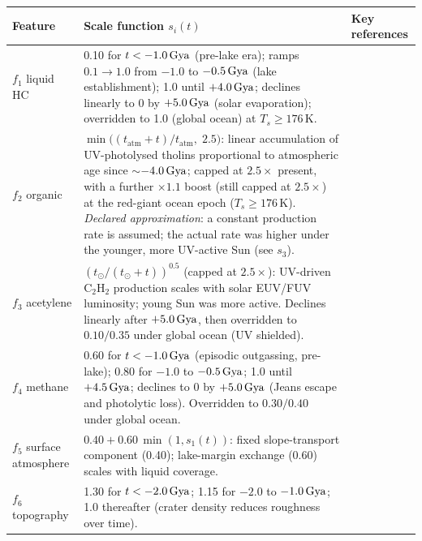 \begin{table}[H]
\centering
\small
\begin{tabular}{p{3.2cm}p{7.0cm}p{3.6cm}}
\toprule
\textbf{Feature} & \textbf{Scale function $s_i(t)$} & \textbf{Key references} \\
\midrule
$f_1$ liquid HC &
  0.10 for $t < -1.0\,\text{Gya}$ (pre-lake era); ramps $0.1\to1.0$ from $-1.0$ to
  $-0.5\,\text{Gya}$ (lake establishment); 1.0 until $+4.0\,\text{Gya}$; declines linearly
  to 0 by $+5.0\,\text{Gya}$ (solar evaporation);
  overridden to 1.0 (global ocean) at $T_s \geq 176\,\mathrm{K}$. &
  \citet{Tobie2006,MitchellLora2016,Lorenz1997,Hayes2016} \\[4pt]

$f_2$ organic &
  $\min\!\bigl((t_\text{atm}\!+\!t)/t_\text{atm},\;2.5\bigr)$: linear accumulation of
  UV-photolysed tholins proportional to atmospheric age since $\sim$$-4.0\,\text{Gya}$;
  capped at $2.5\times$ present, with a further $\times1.1$ boost (still capped at
  $2.5\times$) at the red-giant ocean epoch ($T_s \geq 176\,\mathrm{K}$).  \emph{Declared approximation}: a constant
  production rate is assumed; the actual rate was higher under the younger,
  more UV-active Sun (see $s_3$). &
  \citet{Lavvas2011,Cable2012,Vuitton2007,Niemann2005} \\[4pt]

$f_3$ acetylene &
  $(t_\odot/(t_\odot\!+\!t))^{0.5}$ (capped at $2.5\times$): UV-driven C$_2$H$_2$ production scales with
  solar EUV/FUV luminosity; young Sun was more active.  Declines linearly after
  $+5.0\,\text{Gya}$, then overridden to $0.10/0.35$ under global ocean (UV shielded). &
  \citet{Strobel2010,Lavvas2011,Bahcall2001,Loison2015} \\[4pt]

$f_4$ methane &
  0.60 for $t < -1.0\,\text{Gya}$ (episodic outgassing, pre-lake); 0.80 for
  $-1.0$ to $-0.5\,\text{Gya}$; 1.0 until $+4.5\,\text{Gya}$; declines to 0 by $+5.0\,\text{Gya}$
  (Jeans escape and photolytic loss).  Overridden to $0.30/0.40$ under
  global ocean. &
  \citet{Tobie2006,Niemann2005,Flasar2005,MitchellLora2016,Strobel2010} \\[4pt]

$f_5$ surface atmosphere &
  $0.40 + 0.60\,\min(1,s_1(t))$: fixed slope-transport component (0.40); lake-margin
  exchange (0.60) scales with liquid coverage. &
  \citet{Radebaugh2011,Hayes2016,MitchellLora2016} \\[4pt]

$f_6$ topography &
  1.30 for $t < -2.0\,\text{Gya}$; 1.15 for $-2.0$ to $-1.0\,\text{Gya}$; 1.0 thereafter
  (crater density reduces roughness over time). & \citet{Hedgepeth2020} \\[4pt]


\end{tabular}
\end{table}
